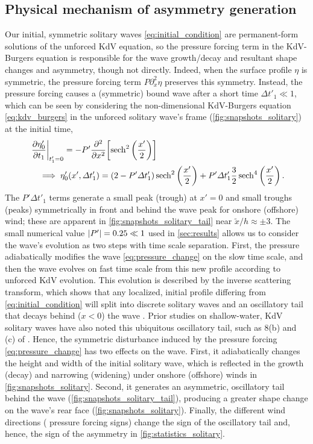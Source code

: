 \documentclass{jfm}
\begin{document}
\subsection{\label{sec:physical_reason} Physical mechanism of asymmetry
generation}
Our initial, symmetric solitary waves \cref{eq:initial_condition} are
permanent-form solutions of the unforced KdV equation, so the pressure
forcing term in the KdV-Burgers equation is responsible for the wave
growth/decay and resultant shape changes and asymmetry, though not
directly.
Indeed, when the surface profile $\eta$ is symmetric, the pressure
forcing term $P \partial_x^2 \eta$ preserves this symmetry.
Instead, the pressure forcing causes a (symmetric) bound wave after a
short time $\Delta t'_1 \ll 1$, which can be seen by considering the
non-dimensional KdV-Burgers equation \cref{eq:kdv_burgers} in the
unforced solitary wave's frame (\cref{fig:snapshots_solitary}) at the
initial time,
\begin{align}
  &\eval{\pdv{\eta'_0}{t_1}}_{t'_1=0} = -P' \pdv[2]{x} \bqty{
  \sech^2\pqty{\frac{x'}{2}}}
  \\
  &\quad \implies \eta'_0(x', \Delta t'_1) =
  (2-P'\Delta t'_1) \sech^2\pqty{\frac{x'}{2}}
  +
  P' \Delta t'_1 \frac{3}{2}\sech^4\pqty{\frac{x'}{2}}
  \,.
  \label{eq:pressure_change}
\end{align}
The $P'\Delta t'_1$ terms generate a small peak (trough) at $x'=0$ and
small troughs (peaks) symmetrically in front and behind the wave peak
for onshore (offshore) wind; these are apparent in
\cref{fig:snapshots_solitary_tail} near $\tilde{x}/h \approx \pm 3$.
The small numerical value $\abs{P'} = 0.25 \ll 1$ used in
\cref{sec:results} allows us to consider the wave's evolution as two
steps with time scale separation.
First, the pressure adiabatically modifies the wave
\cref{eq:pressure_change} on the slow time scale, and then the wave
evolves on fast time scale from this new profile according to unforced
KdV evolution.
This evolution is described by the inverse scattering transform, which
shows that any localized, initial profile differing from
\cref{eq:initial_condition} will split into discrete solitary waves and
an oscillatory tail that decays behind ($x<0$) the wave
\citep[\eg][]{mei2005nonlinear}.
Prior studies on shallow-water, KdV solitary waves have also noted this
ubiquitous oscillatory tail, such as \figsname{} 8(b) and (c) of
\citet{hammack1974korteweg}.
Hence, the symmetric disturbance induced by the pressure forcing
\cref{eq:pressure_change} has two effects on the wave.
First, it adiabatically changes the height and width of the initial
solitary wave, which is reflected in the growth (decay) and narrowing
(widening) under onshore (offshore) winds in
\cref{fig:snapshots_solitary}.
Second, it generates an asymmetric, oscillatory tail behind
the wave (\cref{fig:snapshots_solitary_tail}), producing a greater shape
change on the wave's rear face (\cref{fig:snapshots_solitary}).
Finally, the different wind directions (\ie{} pressure forcing signs)
change the sign of the oscillatory tail and, hence, the sign of the
asymmetry in \cref{fig:statistics_solitary}.
\end{document}
